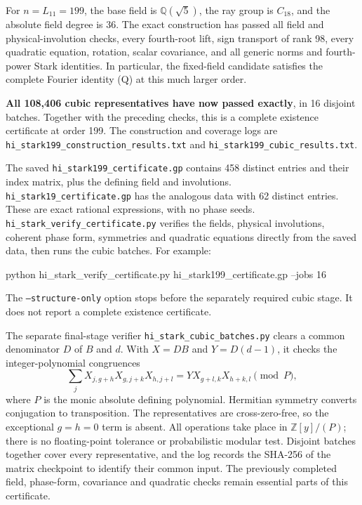 \documentclass[11pt,reqno]{amsart}
\theoremstyle{plain}
\begin{document}
For \(n=L_{11}=199\), the base field is \(\mathbb Q(\sqrt5)\),
the ray group is \(C_{18}\), and the absolute field degree is 36.
The exact construction has passed all field and physical-involution
checks, every fourth-root lift, sign transport of rank 98, every
quadratic equation, rotation, scalar covariance, and all generic
norms and fourth-power Stark identities. In particular, the
fixed-field candidate satisfies the complete Fourier identity (Q)
at this much larger order.

\textbf{All 108,406 cubic representatives have now passed exactly}, in
16 disjoint batches. Together with the preceding checks, this is a
complete existence certificate at order 199. The construction and
coverage logs are \texttt{hi\_\allowbreak stark199\_\allowbreak construction\_\allowbreak results.txt} and
\texttt{hi\_\allowbreak stark199\_\allowbreak cubic\_\allowbreak results.txt}.

The saved \texttt{hi\_\allowbreak stark199\_\allowbreak certificate.gp} contains 458 distinct entries
and their index matrix, plus the defining field and involutions.
\texttt{hi\_\allowbreak stark19\_\allowbreak certificate.gp} has the analogous data with 62 distinct
entries. These are exact rational expressions, with no phase seeds.
\texttt{hi\_\allowbreak stark\_\allowbreak verify\_\allowbreak certificate.py} verifies the fields, physical
involutions, coherent phase form, symmetries and quadratic equations
directly from the saved data, then runs the cubic batches. For example:

\begin{code}
python hi_stark_verify_certificate.py hi_stark199_certificate.gp --jobs 16
\end{code}

The \texttt{--structure-only} option stops before the separately required
cubic stage. It does not report a complete existence certificate.

The separate final-stage verifier \texttt{hi\_\allowbreak stark\_\allowbreak cubic\_\allowbreak batches.py} clears
a common denominator \(D\) of \(B\) and \(d\). With
\(X=DB\) and \(Y=D(d-1)\), it checks the integer-polynomial
congruences
\begin{equation*}
 \sum_jX_{j,g+h}X_{g,j+k}X_{h,j+l}
 =Y X_{g+l,k}X_{h+k,l}\pmod{P}, \tag{35.3}
\end{equation*}
where \(P\) is the monic absolute defining polynomial. Hermitian
symmetry converts conjugation to transposition. The representatives
are cross-zero-free, so the exceptional \(g=h=0\) term is absent.
All operations take place in \(\mathbb Z[y]/(P)\); there is no
floating-point tolerance or probabilistic modular test. Disjoint
batches together cover every representative, and the log records
the SHA-256 of the matrix checkpoint to identify their common input.
The previously completed field, phase-form, covariance and quadratic
checks remain essential parts of this certificate.
\end{document}
